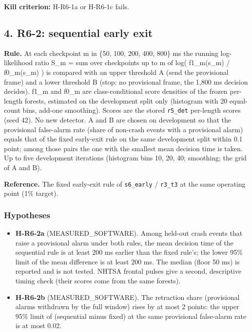\textbf{Kill criterion:} H-R6-1a or H-R6-1c fails.

\subsection*{4. R6-2: sequential early exit}

\textbf{Rule.} At each checkpoint m in \{50, 100, 200, 400, 800\} ms the running log-likelihood ratio S\_m = sum over checkpoints up to m of log( f1\_m(s\_m) / f0\_m(s\_m) ) is compared with an upper threshold A (send the provisional frame) and a lower threshold B (stop: no provisional frame, the 1,800 ms decision decides). f1\_m and f0\_m are class-conditional score densities of the frozen per-length forests, estimated on the development split only (histogram with 20 equal-count bins, add-one smoothing). Scores are the stored \texttt{r5\_det} per-length scores (seed 42). No new detector. A and B are chosen on development so that the provisional false-alarm rate (share of non-crash events with a provisional alarm) equals that of the fixed early-exit rule on the same development split within 0.1 point; among those pairs the one with the smallest mean decision time is taken. Up to five development iterations (histogram bins 10, 20, 40; smoothing; the grid of A and B).

\textbf{Reference.} The fixed early-exit rule of \texttt{s6\_early} / \texttt{r3\_t3} at the same operating point (1\% target).

\subsubsection*{Hypotheses}

\begin{itemize}
\item \textbf{H-R6-2a} (MEASURED\_SOFTWARE). Among held-out crash events that raise a provisional alarm under both rules, the mean decision time of the sequential rule is at least 200 ms earlier than the fixed rule's; the lower 95\% limit of the mean difference is at least 200 ms. The median (floor 50 ms) is reported and is not tested. NHTSA frontal pulses give a second, descriptive timing check (their scores come from the same forests).
\item \textbf{H-R6-2b} (MEASURED\_SOFTWARE). The retraction share (provisional alarms withdrawn by the full window) rises by at most 2 points: the upper 95\% limit of (sequential minus fixed) at the same provisional false-alarm rate is at most 0.02.
\end{itemize}

